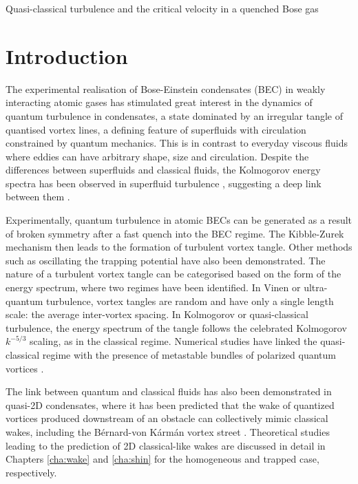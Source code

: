 \begin{chapter}{\label{cha:nonequib}Quasi-classical turbulence and the critical velocity in a quenched Bose gas}
\section{Introduction}
The experimental realisation of Bose-Einstein condensates (BEC) in weakly interacting atomic gases has stimulated great interest in the dynamics of quantum turbulence in condensates, a state dominated by an irregular tangle of quantised vortex lines, a defining feature of superfluids with circulation constrained by quantum mechanics. This is in contrast to everyday viscous fluids where eddies can have arbitrary shape, size and circulation.  Despite the differences between superfluids and classical fluids, the Kolmogorov energy spectra has been observed in superfluid turbulence \cite{Nore,Kobayashi,PhysRevLett.103.084501}, suggesting a deep link between them \cite{barenghi_skrbek_14}.

Experimentally, quantum turbulence in atomic BECs can be generated as a result of broken symmetry after a fast quench into the BEC regime. The Kibble-Zurek mechanism \cite{0305-4470-9-8-029,Zurek85,KZvort99} then leads to the formation of turbulent vortex tangle. Other methods such as oscillating the trapping potential \cite{Henn} have also been demonstrated. The nature of a turbulent vortex tangle can be categorised based on the form of the energy spectrum, where two regimes have been identified. In Vinen or ultra-quantum turbulence, vortex tangles are random and have only a single length scale: the average inter-vortex spacing. In Kolmogorov or quasi-classical turbulence, the energy spectrum of the tangle follows the celebrated Kolmogorov $k^{-5/3}$ scaling, as in the classical regime. Numerical studies have linked the quasi-classical regime with the presence of metastable bundles of polarized quantum vortices \cite{bagg12}.

The link between quantum and classical fluids has also been demonstrated in quasi-2D condensates, where it has been predicted that the wake of quantized vortices produced downstream of an obstacle can collectively mimic classical wakes, including the B{\' e}rnard-von K{\'a}rm{\' a}n vortex street \cite{saito10,stagg_parker_14,reeves_2015}. Theoretical studies leading to the prediction of 2D classical-like wakes are discussed in detail in Chapters \ref{cha:wake} and \ref{cha:shin} for the homogeneous and trapped case, respectively.


\end{chapter}

